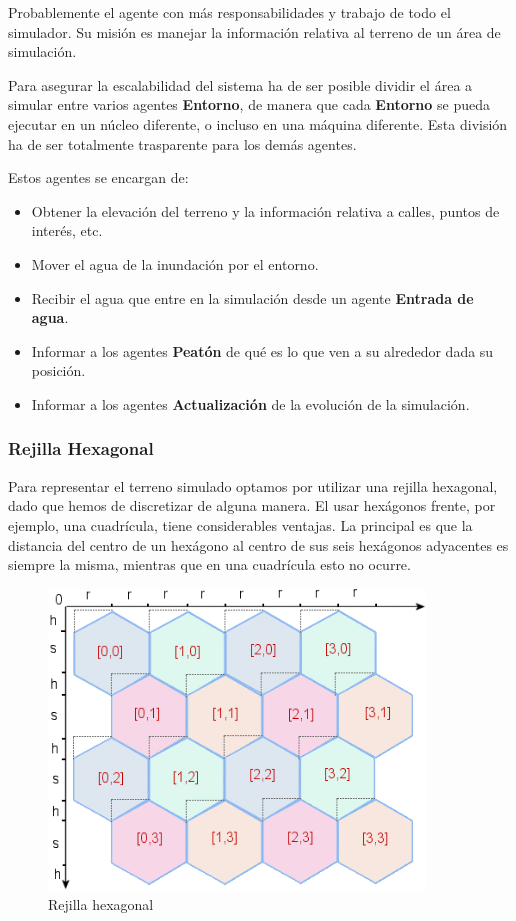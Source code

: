 Probablemente el agente con más responsabilidades y trabajo de todo el
simulador. Su misión es manejar la información relativa al terreno de un área
de simulación.

Para asegurar la escalabilidad del sistema ha de ser posible dividir el área a
simular entre varios agentes {\bf Entorno}, de manera que cada {\bf Entorno} se
pueda ejecutar en un núcleo diferente, o incluso en una máquina diferente. Esta
división ha de ser totalmente trasparente para los demás agentes.

Estos agentes se encargan de:

\begin{itemize}
 \item Obtener la elevación del terreno y la información relativa a calles,
puntos de interés, etc.
 \item Mover el agua de la inundación por el entorno.
 \item Recibir el agua que entre en la simulación desde un agente {\bf Entrada
de agua}.
 \item Informar a los agentes {\bf Peatón} de qué es lo que ven a su alrededor
dada su posición.
 \item Informar a los agentes {\bf Actualización} de la evolución de la
simulación.
\end{itemize}

\subsubsection{Rejilla Hexagonal}

Para representar el terreno simulado optamos por utilizar una rejilla
hexagonal, dado que hemos de discretizar de alguna manera. El usar hexágonos
frente, por ejemplo, una cuadrícula, tiene considerables ventajas. La principal
es que la distancia del centro de un hexágono al centro de sus seis hexágonos
adyacentes es siempre la misma, mientras que en una cuadrícula esto no ocurre.

\begin{figure}[H]
 \centering
 \includegraphics[width=100mm]{figuras/cap3/hexgrid.png}
 \caption{Rejilla hexagonal}
\end{figure}

